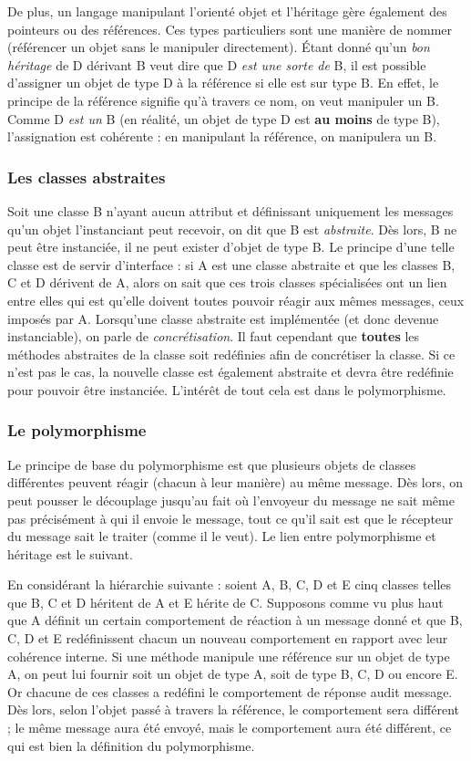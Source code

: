 \documentclass{article}
\begin{document}
		De plus, un langage manipulant l'orienté objet et l'héritage gère également des pointeurs ou des références. Ces types particuliers sont une manière de nommer (référencer
		un objet sans le manipuler directement). Étant donné qu'un \textit{bon héritage} de D dérivant B veut dire que D \textit{est une sorte de} B, il est possible d'assigner un objet
		de type D à la référence si elle est sur type B. En effet, le principe de la référence signifie qu'à travers ce nom, on veut manipuler un B. Comme D \textit{est un} B (en réalité,
		un objet de type D est \textbf{au moins} de type B), l'assignation est cohérente : en manipulant la référence, on manipulera un B.

		\subsubsection{Les classes abstraites}
			Soit une classe B n'ayant aucun attribut et définissant uniquement les messages qu'un objet l'instanciant peut recevoir, on dit que B est \textit{abstraite}. Dès lors,
			B ne peut être instanciée, il ne peut exister d'objet de type B. Le principe d'une telle classe est de servir d'interface : si A est une classe abstraite et que les
			classes B, C et D dérivent de A, alors on sait que ces trois classes spécialisées ont un lien entre elles qui est qu'elle doivent toutes pouvoir réagir aux mêmes messages,
			ceux imposés par A. Lorsqu'une classe abstraite est implémentée (et donc devenue instanciable), on parle de \textit{concrétisation}. Il faut cependant que \textbf{toutes} les
			méthodes abstraites de la classe soit redéfinies afin de concrétiser la classe. Si ce n'est pas le cas, la nouvelle classe est également abstraite et devra être redéfinie pour
			pouvoir être instanciée. L'intérêt de tout cela est dans le polymorphisme.

		\subsubsection{Le polymorphisme}
			Le principe de base du polymorphisme est que plusieurs objets de classes différentes peuvent réagir (chacun à leur manière) au même message. Dès lors, on peut pousser
			le découplage jusqu'au fait où l'envoyeur du message ne sait même pas précisément à qui il envoie le message, tout ce qu'il sait est que le récepteur du message sait le
			traiter (comme il le veut). Le lien entre polymorphisme et héritage est le suivant.

			En considérant la hiérarchie suivante : soient A, B, C, D et E cinq classes telles que B, C et D héritent de A et E hérite de C. Supposons comme vu plus haut que A définit un
			certain comportement de réaction à un message donné et que B, C, D et E redéfinissent chacun un nouveau comportement en rapport avec leur cohérence interne. Si une méthode
			manipule une référence sur un objet de type A, on peut lui fournir soit un objet de type A, soit de type B, C, D ou encore E. Or chacune de ces classes a redéfini le comportement
			de réponse audit message. Dès lors, selon l'objet passé à travers la référence, le comportement sera différent ; le même message aura été envoyé, mais le comportement aura été
			différent, ce qui est bien la définition du polymorphisme.
\end{document}
